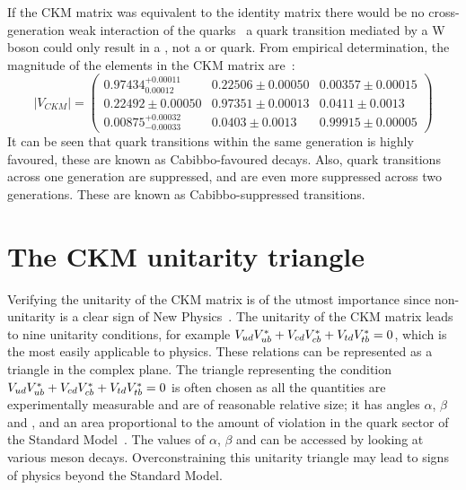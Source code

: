 If the CKM matrix was equivalent to the identity matrix there would be no cross-generation weak interaction of the quarks \eg\ a \uquark quark transition mediated by a W boson could only result in a \dquark, not a \squark or \bquark quark. From empirical determination, the magnitude of the elements in the CKM matrix are~\cite{PDG2016}:
\begin{equation}
| V_{CKM} | = \begin{pmatrix} 0.97434^{+0.00011}_{0.00012} & 0.22506 \pm 0.00050 & 0.00357 \pm 0.00015 \\ 0.22492 \pm 0.00050 & 0.97351 \pm 0.00013 & 0.0411 \pm 0.0013 \\ 0.00875^{+0.00032}_{-0.00033} & 0.0403 \pm 0.0013 & 0.99915 \pm 0.00005 \end{pmatrix}
\end{equation}
It can be seen that quark transitions within the same generation is highly favoured, these are known as Cabibbo-favoured decays. Also, quark transitions across one generation are suppressed, and are even more suppressed across two generations. These are known as Cabibbo-suppressed transitions.

\section{The CKM unitarity triangle}

Verifying the unitarity of the CKM matrix is of the utmost importance since non-unitarity is a clear sign of New Physics~\cite{CKMtriangle}. The unitarity of the CKM matrix leads to nine unitarity conditions, for example ${V_{{u}{d}}}{V_{{u}{b}}^\ast} + {V_{{c}{d}}}{V_{{c}{b}}^\ast} + {V_{{t}{d}}}{V_{{t}{b}}^\ast} = 0$, which is the most easily applicable to \B physics. These relations can be represented as a triangle in the complex plane. The triangle representing the condition ${V_{{u}{d}}}{V_{{u}{b}}^\ast} + {V_{{c}{d}}}{V_{{c}{b}}^\ast} + {V_{{t}{d}}}{V_{{t}{b}}^\ast} = 0$ is often chosen as all the quantities are experimentally measurable and are of reasonable relative size; it has angles $\alpha$, $\beta$ and \Pgamma, and an area proportional to the amount of \CP violation in the quark sector of the Standard Model~\cite{CKMtriangle}. The values of $\alpha$, $\beta$ and \Pgamma can be accessed by looking at various \B meson decays. Overconstraining this unitarity triangle may lead to signs of physics beyond the Standard Model. 

